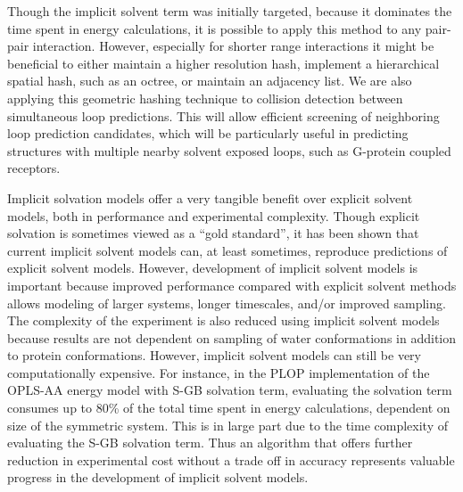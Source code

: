 Though the implicit solvent term was initially targeted, because it dominates the time spent in energy calculations, it is possible to apply this method to any pair-pair interaction.
However, especially for shorter range interactions it might be beneficial to either maintain a higher resolution hash, implement a hierarchical spatial hash, such as an octree, or maintain an adjacency list.
We are also applying this geometric hashing technique to collision detection between simultaneous loop predictions.
This will allow efficient screening of neighboring loop prediction candidates, which will be particularly useful in predicting structures with multiple nearby solvent exposed loops, such as G-protein coupled receptors.

Implicit solvation models offer a very tangible benefit over explicit solvent models, both in performance and experimental complexity.
Though explicit solvation is sometimes viewed as a ``gold standard'', it has been shown that current implicit solvent models can, at least sometimes, reproduce predictions of explicit solvent models.
However, development of implicit solvent models is important because improved performance compared with explicit solvent methods allows modeling of larger systems, longer timescales, and/or improved sampling.
The complexity of the experiment is also reduced using implicit solvent models because results are not dependent on sampling of water conformations in addition to protein conformations.
However, implicit solvent models can still be very computationally expensive.
For instance, in the PLOP implementation of the OPLS-AA energy model with S-GB solvation term, evaluating the solvation term consumes up to 80\% of the total time spent in energy calculations, dependent on size of the symmetric system.
This is in large part due to the time complexity of evaluating the S-GB solvation term.
Thus an algorithm that offers further reduction in experimental cost without a trade off in accuracy represents valuable progress in the development of implicit solvent models.



